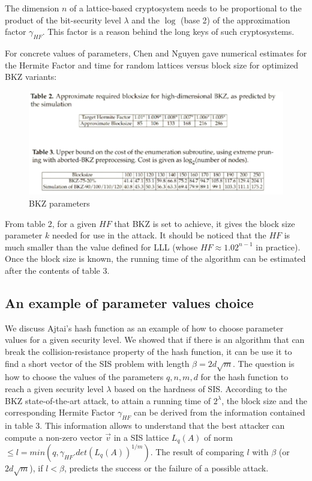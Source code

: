 \begin{remark}
  The dimension $n$ of a lattice-based cryptosystem needs to be proportional to
  the product of the bit-security level $\lambda$ and the $\log$ (base 2) of the
  approximation factor $\gamma_{HF}$.  This factor is a reason behind the long
  keys of such cryptosystems.
  \label{rem:dimension}
\end{remark}

For concrete values of parameters, Chen and Nguyen \cite{chen2011bkz} gave
numerical estimates for the Hermite Factor and time for random lattices versus block
size for optimized BKZ variants:

\begin{figure}[h]
  \centering \includegraphics[scale=0.3]{bkzparams}
  \caption{BKZ parameters}
  \label{fig:BKZParams}
\end{figure}

From table 2, for a given $HF$ that BKZ is set to achieve, it gives the
block size parameter $k$ needed for use in the attack. It should be noticed that the $HF$ is much
smaller than the value defined for LLL (whose $HF \approx 1.02^{n-1}$ in
practice). Once the block size is known, the running time of the algorithm can be estimated after the contents of table 3.

\subsection{An example of parameter values choice}
\label{sec:parameterChoice}
We discuss Ajtai's hash function as an example of how to choose parameter values for
a given security level. We showed that if there is an algorithm that can break the
collision-resistance property of the hash function, it can be use it to find a
short vector of the SIS problem with length $\beta = 2d\sqrt{m}$. The question
is how to choose the values of the parameters $q,n,m,d$ for the hash function to reach a
given security level $\lambda$ based on the hardness of SIS. According to the
BKZ state-of-the-art attack, to attain a running time of $2^\lambda$, the block size and the corresponding Hermite Factor $\gamma_{HF}$ can be derived from the information contained in
table 3.
This information allows to understand that the best attacker can compute a non-zero vector $\vec{v}$ in a SIS
lattice $L_q(A)$ of norm $\leq l = min(q, \gamma_{HF}.det(L_q(A))^{1/m})$. 
The result of comparing $l$ with $\beta$ (or $2d\sqrt{m}$), if $l < \beta$, predicts the success or the failure of a possible attack.

